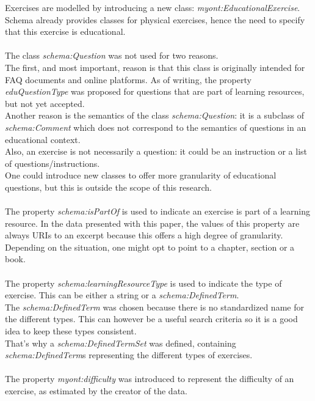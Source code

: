 \documentclass[a4paper]{report}
\begin{document}
    Exercises are modelled by introducing a new class: \textit{myont:EducationalExercise}. Schema already provides classes for physical exercises, hence the need to specify that this exercise is educational.\\ \\
    The class \textit{schema:Question} was not used for two reasons.\\
    The first, and most important, reason is that this class is originally intended for FAQ documents and online platforms.
    As of writing, the property \textit{eduQuestionType} was proposed for questions that are part of learning resources, but not yet accepted.\\
    Another reason is the semantics of the class \textit{schema:Question}: it is a subclass of \textit{schema:Comment} which does not correspond to the semantics of questions in an educational context.\\
    Also, an exercise is not necessarily a question: it could be an instruction or a list of questions/instructions.\\
    One could introduce new classes to offer more granularity of educational questions, but this is outside the scope of this research.\\ \\
    The property \textit{schema:isPartOf} is used to indicate an exercise is part of a learning resource.
    In the data presented with this paper, the values of this property are always URIs to an excerpt because this offers a high degree of granularity.
    Depending on the situation, one might opt to point to a chapter, section or a book.\\ \\
    The property \textit{schema:learningResourceType} is used to indicate the type of exercise. This can be either a string or a \textit{schema:DefinedTerm}.\\
    The \textit{schema:DefinedTerm} was chosen because there is no standardized name for the different types. This can however be a useful search criteria so it is a good idea to keep these types consistent.\\
    That's why a \textit{schema:DefinedTermSet} was defined, containing \textit{schema:DefinedTerm}s representing the different types of exercises.\\ \\
    The property \textit{myont:difficulty} was introduced to represent the difficulty of an exercise, as estimated by the creator of the data.\\
\end{document}

